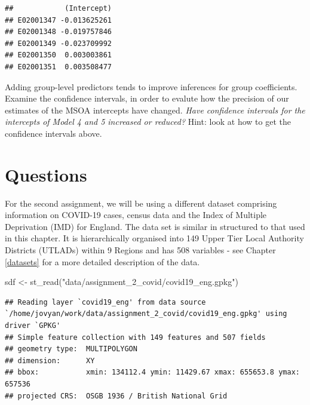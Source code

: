 \documentclass[
]{book}
\newenvironment{Shaded}{\begin{snugshade}}{\end{snugshade}}
\newcommand{\CommentTok}[1]{\textcolor[rgb]{0.56,0.35,0.01}{\textit{#1}}}
\newcommand{\DecValTok}[1]{\textcolor[rgb]{0.00,0.00,0.81}{#1}}
\newcommand{\FunctionTok}[1]{\textcolor[rgb]{0.00,0.00,0.00}{#1}}
\newcommand{\NormalTok}[1]{#1}
\newcommand{\OtherTok}[1]{\textcolor[rgb]{0.56,0.35,0.01}{#1}}
\newcommand{\SpecialCharTok}[1]{\textcolor[rgb]{0.00,0.00,0.00}{#1}}
\newcommand{\StringTok}[1]{\textcolor[rgb]{0.31,0.60,0.02}{#1}}
\begin{document}
\begin{Shaded}
\end{Shaded}

\begin{verbatim}
##            (Intercept)
## E02001347 -0.013625261
## E02001348 -0.019757846
## E02001349 -0.023709992
## E02001350  0.003003861
## E02001351  0.003508477
\end{verbatim}

Adding group-level predictors tends to improve inferences for group coefficients. Examine the confidence intervals, in order to evalute how the precision of our estimates of the MSOA intercepts have changed. \emph{Have confidence intervals for the intercepts of Model 4 and 5 increased or reduced?} Hint: look at how to get the confidence intervals above.

\hypertarget{questions-3}{%
\section{Questions}\label{questions-3}}

For the second assignment, we will be using a different dataset comprising information on COVID-19 cases, census data and the Index of Multiple Deprivation (IMD) for England. The data set is similar in structured to that used in this chapter. It is hierarchically organised into 149 Upper Tier Local Authority Districts (UTLADs) within 9 Regions and has 508 variables - see Chapter \ref{datasets} for a more detailed description of the data.

\begin{Shaded}
\begin{Highlighting}[]
\NormalTok{sdf }\OtherTok{\textless{}{-}} \FunctionTok{st\_read}\NormalTok{(}\StringTok{"data/assignment\_2\_covid/covid19\_eng.gpkg"}\NormalTok{)}
\end{Highlighting}
\end{Shaded}

\begin{verbatim}
## Reading layer `covid19_eng' from data source `/home/jovyan/work/data/assignment_2_covid/covid19_eng.gpkg' using driver `GPKG'
## Simple feature collection with 149 features and 507 fields
## geometry type:  MULTIPOLYGON
## dimension:      XY
## bbox:           xmin: 134112.4 ymin: 11429.67 xmax: 655653.8 ymax: 657536
## projected CRS:  OSGB 1936 / British National Grid
\end{verbatim}
\end{document}
